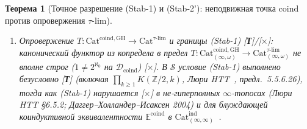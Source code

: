 \documentclass[11pt]{article}
\theoremstyle{plain}
\newtheorem{theorem}{Теорема}[section]
\theoremstyle{definition}
\newcommand{\Cat}{\mathrm{Cat}}
\begin{document}
\begin{theorem}[Точное разрешение \textup{(Stab-1)} и \textup{(Stab-2')}: неподвижная точка $\mathrm{coind}$ против опровержения $\tau\text{-}\mathrm{lim}$]
\begin{enumerate}[nosep,label=(\roman*)]
\item \emph{Опровержение $T : \Cat^{\mathrm{coind, GH}} \to \Cat^{\tau\text{-}\mathrm{lim}}$ и границы \textup{(Stab-1)} \textup{[\textbf{Т}]}/[\textbf{$\times$}]}: канонический функтор из копредела в предел $T : \Cat_{(\infty,\omega)}^{\mathrm{coind, GH}} \to \Cat_{(\infty,\omega)}^{\tau\text{-}\mathrm{lim}}$ не вполне строг ($1 \neq 2^{\aleph_0}$ на $\mathcal{D}_{\mathrm{coind}}$) \textup{[\textbf{$\times$}]}. В $\mathcal{S}$ условие \textup{(Stab-1)} выполнено безусловно \textup{[\textbf{Т}]} (включая $\prod_{k \ge 1} K(\mathbb{Z}/2, k)$, Люри HTT~\cite{LurieHTT}, предл.~5.5.6.26), тогда как \textup{(Stab-1)} нарушается \textup{[\textbf{$\times$}]} в не-гиперполных $\infty$-топосах (Люри HTT \S 6.5.2; Даггер--Холландер--Исаксен 2004) и для блуждающей коиндуктивной эквивалентности $\mathbb{E}^{\mathrm{coind}}$ в $\Cat_{(\infty,\infty)}^{\mathrm{ind}}$~\cite{Goldthorpe2023}.
\end{enumerate}
\end{theorem}
\end{document}
